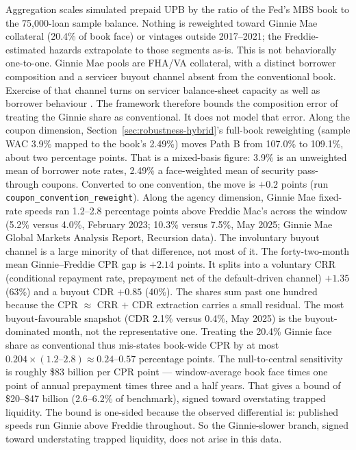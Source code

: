 \documentclass[12pt]{article}
\begin{document}
Aggregation scales simulated prepaid UPB by the ratio of the Fed's MBS book to the 75,000-loan sample balance. Nothing is reweighted toward Ginnie Mae collateral (20.4\% of book face) or vintages outside 2017--2021; the Freddie-estimated hazards extrapolate to those segments as-is. This is not behaviorally one-to-one. Ginnie Mae pools are FHA/VA collateral, with a distinct borrower composition and a servicer buyout channel absent from the conventional book. Exercise of that channel turns on servicer balance-sheet capacity as well as borrower behaviour \citep{aiello2022}. The framework therefore bounds the composition error of treating the Ginnie share as conventional. It does not model that error. Along the coupon dimension, Section~\ref{sec:robustness-hybrid}'s full-book reweighting (sample WAC 3.9\% mapped to the book's 2.49\%) moves Path B from 107.0\% to 109.1\%, about two percentage points. That is a mixed-basis figure: 3.9\% is an unweighted mean of borrower note rates, 2.49\% a face-weighted mean of security pass-through coupons. Converted to one convention, the move is $+0.2$ points (run \texttt{coupon\_convention\_reweight}). Along the agency dimension, Ginnie Mae fixed-rate speeds ran 1.2--2.8 percentage points above Freddie Mac's across the window (5.2\% versus 4.0\%, February 2023; 10.3\% versus 7.5\%, May 2025; Ginnie Mae Global Markets Analysis Report, Recursion data). The involuntary buyout channel is a large minority of that difference, not most of it. The forty-two-month mean Ginnie--Freddie CPR gap is $+2.14$ points. It splits into a voluntary CRR (conditional repayment rate, prepayment net of the default-driven channel) $+1.35$ (63\%) and a buyout CDR $+0.85$ (40\%). The shares sum past one hundred because the CPR $\approx$ CRR $+$ CDR extraction carries a small residual. The most buyout-favourable snapshot (CDR 2.1\% versus 0.4\%, May 2025) is the buyout-dominated month, not the representative one. Treating the 20.4\% Ginnie face share as conventional thus mis-states book-wide CPR by at most $0.204 \times (1.2\text{--}2.8) \approx 0.24$--$0.57$ percentage points. The null-to-central sensitivity is roughly \$83 billion per CPR point --- window-average book face times one point of annual prepayment times three and a half years. That gives a bound of \$20--\$47 billion (2.6--6.2\% of benchmark), signed toward overstating trapped liquidity. The bound is one-sided because the observed differential is: published speeds run Ginnie above Freddie throughout. So the Ginnie-slower branch, signed toward understating trapped liquidity, does not arise in this data.
\end{document}
